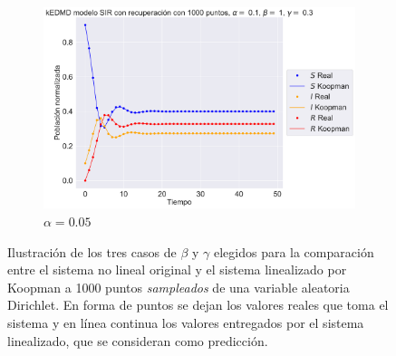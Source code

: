 \begin{figure}[htbp]
\begin{subfigure}[b]{0.32\textwidth}
        \label{fig:image2}
    \end{subfigure}
    \hfill
    \begin{subfigure}[b]{0.32\textwidth}
        \centering
        \includegraphics[width=\textwidth]{img/content/chapter3/SIR_rec3.pdf}
        \caption{$\alpha=0.05$}
    \end{subfigure}
    \caption{Ilustración de los tres casos de $\beta$ y $\gamma$ elegidos para la comparación entre el sistema no lineal original y el sistema linealizado por Koopman a 1000 puntos \textit{sampleados} de una variable aleatoria Dirichlet. En forma de puntos se dejan los valores reales que toma el sistema y en línea continua los valores entregados por el sistema linealizado, que se consideran como predicción.}
    \label{fig:Comp_traj_SIR}
\end{figure}
